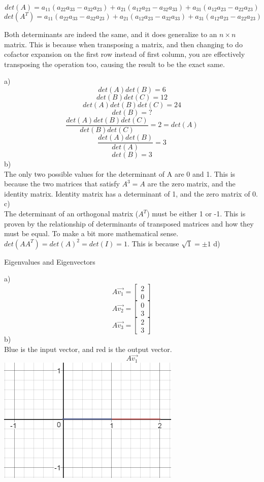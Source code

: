 \documentclass[12pt]{article}
\newcommand{\sqbrl}{\left[}
\newcommand{\sqbrr}{\right]}
\newenvironment{problem}[2][Problem]{\begin{trivlist}
\item[\hskip \labelsep {\bfseries #1}\hskip \labelsep {\bfseries #2.}]}{\end{trivlist}}
\begin{document}
\[det(A) = a_{11}(a_{22}a_{33} - a_{32}a_{23}) + a_{21}(a_{12}a_{23} - a_{32}a_{33}) + a_{31}(a_{12}a_{23} - a_{22}a_{23})\]
\[det(A^T) = a_{11}(a_{22}a_{33} - a_{32}a_{23}) + a_{21}(a_{12}a_{23} - a_{32}a_{33}) + a_{31}(a_{12}a_{23} - a_{22}a_{23})\]

Both determinants are indeed the same, and it does generalize to an $n\times n$ matrix. This is because when transposing a matrix, and then changing to do cofactor expansion on the first row instead of first column, you are effectively transposing the operation too, causing the result to be the exact same.

\begin{problem}{10}
\end{problem}
a)\\
\[det(A)det(B) = 6\]
\[det(B)det(C) = 12\]
\[det(A)det(B)det(C) = 24\]
\[det(B) = ?\]
\[\frac{det(A)det(B)det(C)}{det(B)det(C)} = 2 = det(A)\]
\[\frac{det(A)det(B)}{det(A)} = 3\]
\[det(B) = 3\]
b)\\
The only two possible values for the determinant of A are 0 and 1. This is because the two matrices that satisfy $A^3 = A$ are the zero matrix, and the identity matrix. Identity matrix has a determinant of 1, and the zero matrix of 0.\\
c)\\
The determinant of an orthogonal matrix ($A^T$) must be either 1 or -1. This is proven by the relationship of determinants of transposed matrices and how they must be equal. To make a bit more mathematical sense. $det(AA^T) = det(A)^2 = det(I) = 1$. This is because $\sqrt{1} = \pm 1$
d)\\


\begin{problem}{11}
	Eigenvalues and Eigenvectors
\end{problem}
a)\\
\[A\vec{v_1} = \sqbrl\begin{matrix}2\\0\end{matrix}\sqbrr\]
\[A\vec{v_2} = \sqbrl\begin{matrix}0\\3\end{matrix}\sqbrr\]
\[A\vec{v_3} = \sqbrl\begin{matrix}2\\3\end{matrix}\sqbrr\]
b)\\
Blue is the input vector, and red is the output vector.\\
\[A\vec{v_1} \]
\includegraphics{Av1}
\end{document}
